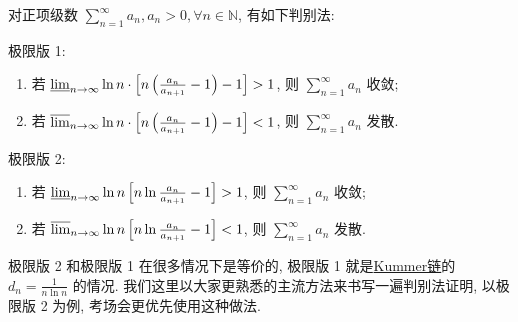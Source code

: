 \documentclass[../../main.tex]{subfiles}
\begin{document}
\begin{theorem}[较为广泛的判别法]\label{theorem:较为广泛的判别法}
对正项级数 \( \sum_{n=1}^\infty a_n, a_n > 0, \forall n \in \mathbb{N} \), 有如下判别法:

极限版 1:
\begin{enumerate}
\item 若 \( \varliminf_{n \to \infty} \ln n \cdot \left[ n \left( \frac{a_n}{a_{n + 1}} - 1 \right) - 1 \right] > 1 \), 则 \( \sum_{n=1}^\infty a_n \) 收敛;

\item 若 \( \varlimsup_{n \to \infty} \ln n \cdot \left[ n \left( \frac{a_n}{a_{n + 1}} - 1 \right) - 1 \right] < 1 \), 则 \( \sum_{n=1}^\infty a_n \) 发散.
\end{enumerate}

极限版 2:
\begin{enumerate}
\item 若 \( \varliminf_{n \to \infty} \ln n \left[ n \ln \frac{a_n}{a_{n + 1}} - 1 \right] > 1 \), 则 \( \sum_{n=1}^\infty a_n \) 收敛;
\item 若 \( \varlimsup_{n \to \infty} \ln n \left[ n \ln \frac{a_n}{a_{n + 1}} - 1 \right] < 1 \), 则 \( \sum_{n=1}^\infty a_n \) 发散.
\end{enumerate}
\end{theorem}
\begin{note}
极限版 2 和极限版 1 在很多情况下是等价的, 极限版 1 就是\hyperref[theorem:Kummer链]{Kummer链}的 \( d_n = \frac{1}{n \ln n} \) 的情况. 我们这里以大家更熟悉的主流方法来书写一遍判别法证明, 以极限版 2 为例, 考场会更优先使用这种做法.
\end{note}
\end{document}
